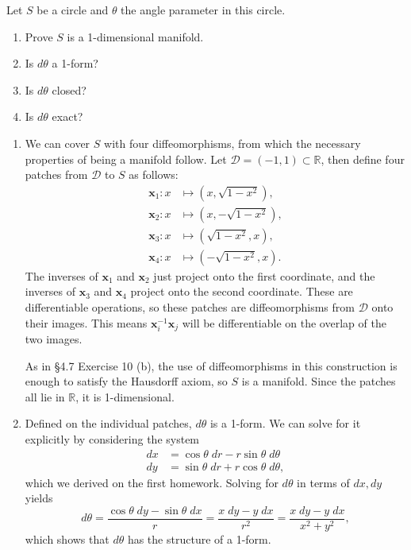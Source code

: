 \documentclass[10pt]{report}
\begin{document}
\begin{exer}[]
	Let $S$ be a circle and $\theta$ the angle parameter in this circle.
	\begin{enumerate}
		\item Prove $S$ is a 1-dimensional manifold.
		\item Is $d\theta$ a 1-form?
		\item Is $d\theta$ closed?
		\item Is $d\theta$ exact?
	\end{enumerate}
\end{exer}
\begin{enumerate}
	\item We can cover $S$ with four diffeomorphisms, from which the necessary properties of being a manifold follow. Let $\mathcal{D} = (-1,1) \subset \mathbb{R}$, then define four patches from $\mathcal{D}$ to $S$ as follows:
		\begin{align*}
			\mathbf{x}_{1}: x&\mapsto (x,\sqrt{1-x^2} ), \\
			\mathbf{x}_{2}: x&\mapsto (x,-\sqrt{1-x^2} ), \\
			\mathbf{x}_{3}: x&\mapsto (\sqrt{1-x^2},x ), \\
			\mathbf{x}_{4}: x&\mapsto (-\sqrt{1-x^2},x ).
		\end{align*}
		The inverses of $\mathbf{x}_1$ and $\mathbf{x}_2$ just project onto the first coordinate, and the inverses of $\mathbf{x}_3$ and $\mathbf{x}_4$ project onto the second coordinate. These are differentiable operations, so these patches are diffeomorphisms from $\mathcal{D}$ onto their images. This means $\mathbf{x}_{i}^{-1}\mathbf{x}_{j}$ will be differentiable on the overlap of the two images.

		As in \S 4.7 Exercise 10 (b), the use of diffeomorphisms in this construction is enough to satisfy the Hausdorff axiom, so $S$ is a manifold. Since the patches all lie in $\mathbb{R}$, it is 1-dimensional.

	\item Defined on the individual patches, $d\theta$ is a 1-form. We can solve for it explicitly by considering the system
		\begin{align*}
			dx &= \cos \theta \;dr - r \sin \theta\;d\theta \\
			dy &= \sin \theta\;dr + r \cos \theta\;d\theta,
		\end{align*}
		which we derived on the first homework. Solving for $d\theta$ in terms of $dx,dy$ yields
		\[
		d\theta = \frac{\cos\theta\;dy-\sin\theta\;dx}{r} = \frac{x\;dy-y\;dx}{r^2} = \frac{x\;dy-y\;dx}{x^2+y^2},
		\] 
		which shows that $d\theta$ has the structure of a 1-form.


\end{enumerate}
\end{document}
